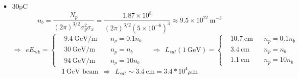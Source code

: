 \documentclass[%
onecolumn, notitlepage,
 amsmath,amssymb,
 aps,
]{article}
\begin{document}
\begin{itemize}
$$\begin{aligned}
&17 ~\text{GeV/m }&& n_p=0.1 n_b \\
&54 ~\text{GeV/m} && n_p=n_b\\
&172 ~\text{GeV/m} &&n_p=10 n_b
\end{aligned}\right.\quad\Rightarrow ~~L_{sat}(1 ~\text{GeV})=\left\{\begin{aligned}
&5.8 ~\text{cm}&& n_p=0.1 n_b \\
&1.9 ~\text{cm} && n_p=n_b\\
&0.6 ~\text{cm} &&n_p=10 n_b
\end{aligned}\right.$$
$$1 ~\text{GeV beam} ~~\Rightarrow ~~ L_{sat}\sim 2 ~\text{cm}=2*10^4 \mu \text{m} $$
\item  30pC $$n_b=\frac{N_p}{(2\pi)^{3/2} \sigma_y^2\sigma_x}=\frac{1.87\times 10^{8}}{(2\pi)^{3/2} (5\times 10^{-6})^3}\approx 9.5\times 10^{22}~ \text{m}^{-3} $$
$$\Rightarrow ~~eE_{\text{wb}}=\left\{\begin{aligned}
&9.4 ~\text{GeV/m }&& n_p=0.1 n_b \\
&30 ~\text{GeV/m} && n_p=n_b\\
&94 ~\text{GeV/m} &&n_p=10 n_b
\end{aligned}\right.\quad\Rightarrow ~~L_{sat}(1 ~\text{GeV})=\left\{\begin{aligned}
&10.7 ~\text{cm}&& n_p=0.1 n_b \\
&3.4 ~\text{cm} && n_p=n_b\\
&1.1 ~\text{cm} &&n_p=10 n_b
\end{aligned}\right.$$
$$1 ~\text{GeV beam} ~~\Rightarrow ~~ L_{sat}\sim 3.4 ~\text{cm}=3.4*10^4 \mu \text{m} $$

\end{itemize}
\end{document}
